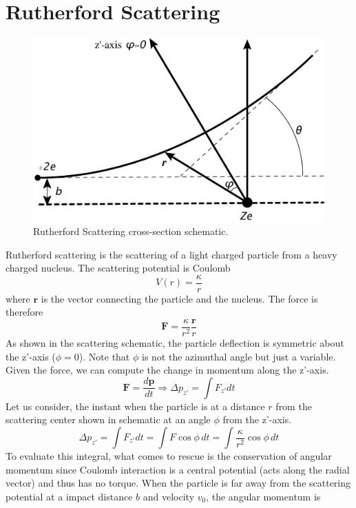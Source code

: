 \documentclass[aps,prb,onecolumn,notitlepage,showpacs,floatfix,superscriptaddress]{revtex4-1}
\begin{document}
\section{Rutherford Scattering}
\begin{figure}[hbtp]
\centering
\includegraphics[scale=0.1]{Rutherford.png}
\caption{Rutherford Scattering cross-section schematic.}
\end{figure}
Rutherford scattering is the scattering of a light charged particle from a heavy charged nucleus. The scattering potential is Coulomb
\begin{equation}
V(r)=\dfrac{\kappa}{r}
\end{equation}
where ${\bm r}$ is the vector connecting the particle and the nucleus. The force is therefore
\begin{equation}
{\bm F} = \dfrac{\kappa}{r^2	} \dfrac{{\bm r}}{r}
\end{equation}
As shown in the scattering schematic, the particle deflection is symmetric about the z'-axis ($\phi=0$). Note that $\phi$ is not the azimuthal angle but just a variable. Given the force, we can compute the change in momentum along the z'-axis.
\begin{equation}
{\bm F}=\dfrac{d{\bm p}}{dt} \Rightarrow \Delta p_{z'} = \int F_{z'} dt 
\end{equation}
Let us consider, the instant when the particle is at a distance $r$ from the scattering center shown in schematic at an angle $\phi$ from the z'-axis. 
\begin{equation}
\Delta p_{z'} = \int F_{z'} dt = \int F \cos\phi \, dt = \int \dfrac{\kappa}{r^2} \cos\phi \, dt
\end{equation}
To evaluate this integral, what comes to rescue is the conservation of angular momentum since Coulomb interaction is a central potential (acts along the radial vector) and thus has no torque. When the particle is far away from the scattering potential at a impact distance $b$ and velocity $v_0$, the angular momentum is
\end{document}
